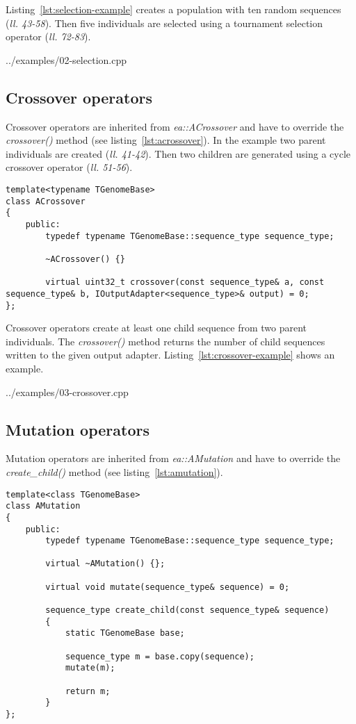 \documentclass[a4paper]{article}
\begin{document}
Listing~\ref{lst:selection-example} creates a population with ten random sequences  (\textit{ll. 43-58}). Then five individuals are selected using a tournament selection operator (\textit{ll. 72-83}).

\begin{lstinputlisting}[caption=selection operators,label=lst:selection-example]{../examples/02-selection.cpp}
\end{lstinputlisting}

\subsection{Crossover operators}

Crossover operators are inherited from \textit{ea::ACrossover} and have to override the \textit{crossover()} method (see listing~\ref{lst:acrossover}). In the example two parent individuals are created (\textit{ll. 41-42}). Then two children are generated using a cycle crossover operator (\textit{ll. 51-56}). 

\begin{lstlisting}[caption=ACrossover,label=lst:acrossover]
template<typename TGenomeBase>
class ACrossover
{
	public:
		typedef typename TGenomeBase::sequence_type sequence_type;

		~ACrossover() {}

		virtual uint32_t crossover(const sequence_type& a, const sequence_type& b, IOutputAdapter<sequence_type>& output) = 0;
};
\end{lstlisting}

Crossover operators create at least one child sequence from two parent individuals. The \textit{crossover()} method returns the number of child sequences written to the given output adapter. Listing~\ref{lst:crossover-example} shows an example.

\begin{lstinputlisting}[caption=crossover operators,label=lst:crossover-example]{../examples/03-crossover.cpp}
\end{lstinputlisting}

\subsection{Mutation operators}

Mutation operators are inherited from \textit{ea::AMutation} and have to override the \textit{create\_child()} method (see listing~\ref{lst:amutation}). 

\begin{lstlisting}[caption=AMutation,label=lst:amutation]
template<class TGenomeBase>
class AMutation
{
	public:
		typedef typename TGenomeBase::sequence_type sequence_type;

		virtual ~AMutation() {};

		virtual void mutate(sequence_type& sequence) = 0;

		sequence_type create_child(const sequence_type& sequence)
		{
			static TGenomeBase base;

			sequence_type m = base.copy(sequence);
			mutate(m);

			return m;
		}
};
\end{lstlisting}
\end{document}
